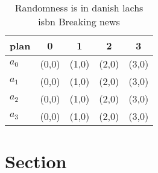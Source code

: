 \documentclass[a4paper]{article}
\begin{document}
\begin{table}
\begin{adjustbox}{width=0.5\columnwidth}
\begin{tabular}{|l|l|l|l|l|}
\hline
\textbf{plan} & \multicolumn{1}{c|}{\textbf{0}} & \multicolumn{1}{c|}{\textbf{1}} & \multicolumn{1}{c|}{\textbf{2}} & \multicolumn{1}{c|}{\textbf{3}} \\ \hline
\textbf{$a_0$}  & (0,0) & (1,0) & (2,0) & (3,0) \\ \hline
\textbf{$a_1$}  & (0,0) & (1,0) & (2,0) & (3,0) \\ \hline
\textbf{$a_2$}  & (0,0) & (1,0) & (2,0) & (3,0) \\ \hline
\textbf{$a_3$}  & (0,0) & (1,0) & (2,0) & (3,0) \\ \hline
\end{tabular}
\end{adjustbox}
\caption{Randomness is in danish lachs isbn Breaking news 
}
\end{table}

\section{Section}
\end{document}
